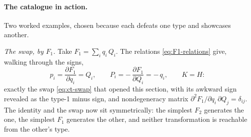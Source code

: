 \documentclass[11pt]{article}
\theoremstyle{plain}
\theoremstyle{definition}
\theoremstyle{remark}
\newcommand{\pd}[2]{\frac{\partial #1}{\partial #2}}
\begin{document}
\paragraph{The catalogue in action.}
Two worked examples, chosen because each defeats one type and
showcases another.

\emph{The swap, by $F_1$.} Take $F_1 = \sum_i q_i\,Q_i$. The relations
\eqref{eq:F1-relations} give, walking through the signs,
\begin{equation}
  p_i = \pd{F_1}{q_i} = Q_i,
  \qquad
  P_i = -\,\pd{F_1}{Q_i} = -\,q_i,
  \qquad
  K = H :
\end{equation}
exactly the swap \eqref{eq:ct-swap} that opened this section, with its
awkward sign revealed as the type-1 minus sign, and nondegeneracy
matrix $\partial^2 F_1/\partial q_i\,\partial Q_j = \delta_{ij}$. The
identity and the swap now sit symmetrically: the simplest $F_2$
generates the one, the simplest $F_1$ generates the other, and neither
transformation is reachable from the other's type.
\end{document}
